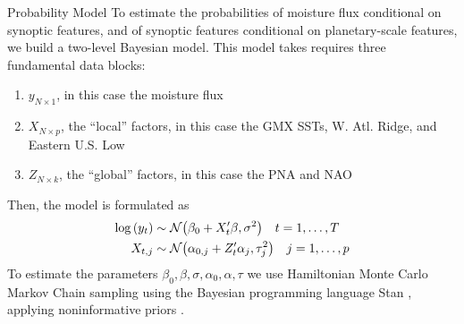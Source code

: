 \begin{block}{Probability Model}
    To estimate the  probabilities of moisture flux conditional on synoptic features, and of synoptic features conditional on planetary-scale features, we build a two-level Bayesian model.
    This model takes requires three fundamental data blocks:
    \begin{enumerate}
        \item $y_{N \times 1}$, in this case the moisture flux
        \item $X_{N \times p}$, the ``local'' factors, in this case the GMX SSTs, W. Atl. Ridge, and Eastern U.S. Low
        \item $Z_{N \times k}$, the ``global'' factors, in this case the PNA and NAO
    \end{enumerate}
    Then, the model is formulated as
    \begin{align}
        \log \qty(y_t) & \sim \mathcal{N} \qty(\beta_0 + X'_t \beta, \sigma^2) \quad t = 1, \ldots, T \label{eq:yX}\\
        X_{t,j} &\sim \mathcal{N} \qty(\alpha_{0,j} + Z'_t \alpha_j, \tau_j^2) \quad j = 1, \ldots, p \label{eq:XZ}
    \end{align}
    To estimate the parameters $\beta_0, \beta, \sigma, \alpha_0, \alpha, \tau$ we use Hamiltonian Monte Carlo Markov Chain sampling using the Bayesian programming language Stan \cite{Carpenter2016}, applying noninformative priors \cite{Gelman2014}.
\end{block}
